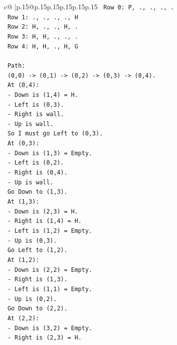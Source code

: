 \documentclass{article}
\begin{document}
{\begin{supertabular}{c@{$\;$}|p{.15\linewidth}@{}p{.15\linewidth}p{.15\linewidth}p{.15\linewidth}p{.15\linewidth}p{.15\linewidth}}
{{{\texttt{   Row 0: P, ., ., ., .} \\
\texttt{   Row 1: ., ., ., ., H} \\
\texttt{   Row 2: H, ., ., H, .} \\
\texttt{   Row 3: H, H, ., ., .} \\
\texttt{   Row 4: H, H, ., H, G} \\
\\ 
\texttt{   Path:} \\
\texttt{   (0,0) {-}> (0,1) {-}> (0,2) {-}> (0,3) {-}> (0,4).} \\
\texttt{   At (0,4):} \\
\texttt{     {-} Down is (1,4) = H.} \\
\texttt{     {-} Left is (0,3).} \\
\texttt{     {-} Right is wall.} \\
\texttt{     {-} Up is wall.} \\
\texttt{   So I must go Left to (0,3).} \\
\texttt{   At (0,3):} \\
\texttt{     {-} Down is (1,3) = Empty.} \\
\texttt{     {-} Left is (0,2).} \\
\texttt{     {-} Right is (0,4).} \\
\texttt{     {-} Up is wall.} \\
\texttt{   Go Down to (1,3).} \\
\texttt{   At (1,3):} \\
\texttt{     {-} Down is (2,3) = H.} \\
\texttt{     {-} Right is (1,4) = H.} \\
\texttt{     {-} Left is (1,2) = Empty.} \\
\texttt{     {-} Up is (0,3).} \\
\texttt{   Go Left to (1,2).} \\
\texttt{   At (1,2):} \\
\texttt{     {-} Down is (2,2) = Empty.} \\
\texttt{     {-} Right is (1,3).} \\
\texttt{     {-} Left is (1,1) = Empty.} \\
\texttt{     {-} Up is (0,2).} \\
\texttt{   Go Down to (2,2).} \\
\texttt{   At (2,2):} \\
\texttt{     {-} Down is (3,2) = Empty.} \\
\texttt{     {-} Right is (2,3) = H.} \\
}}}
\end{supertabular}}
\end{document}
